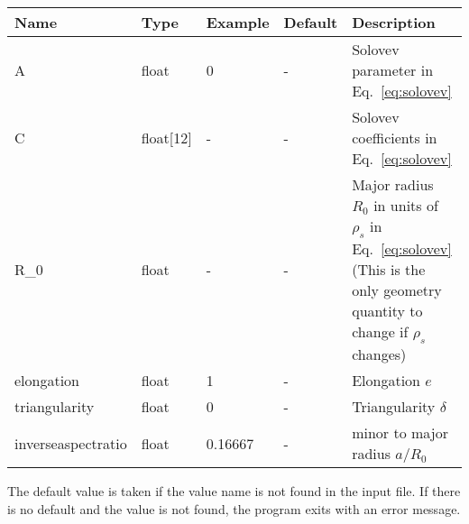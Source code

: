 \begin{longtable}{llll>{\RaggedRight}p{7cm}}
\toprule
\rowcolor{gray!50}\textbf{Name} &  \textbf{Type} & \textbf{Example} & \textbf{Default} & \textbf{Description}  \\ \midrule
    A      & float & 0 &  - & Solovev parameter in Eq.~\eqref{eq:solovev} \\
    C      & float[12] &  - & - & Solovev coefficients in Eq.~\eqref{eq:solovev}  \\
    R\_0   & float & - & -  & Major radius $R_0$ in units of $\rho_s$ in Eq.~\eqref{eq:solovev} (This is the only geometry quantity to change if $\rho_s$ changes)\\
    elongation    & float & 1 & - & Elongation $e$ \\
    triangularity & float & 0 & - & Triangularity $\delta$ \\
    inverseaspectratio & float & 0.16667 & - & minor to major radius $a/R_0$ \\
\bottomrule
\end{longtable}
The default value is taken if the value name is not found in the input file. If there is no default and
the value is not found,
the program exits with an error message.

